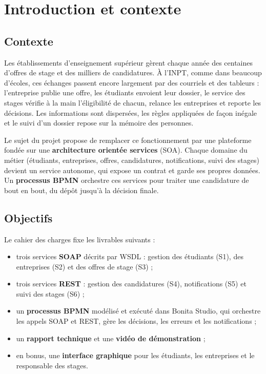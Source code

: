 \chapter{Introduction et contexte}\label{chap:introduction}

\section{Contexte}

Les établissements d'enseignement supérieur gèrent chaque année des centaines d'offres de stage et des milliers de candidatures. À l'INPT, comme dans beaucoup d'écoles, ces échanges passent encore largement par des courriels et des tableurs : l'entreprise publie une offre, les étudiants envoient leur dossier, le service des stages vérifie à la main l'éligibilité de chacun, relance les entreprises et reporte les décisions. Les informations sont dispersées, les règles appliquées de façon inégale et le suivi d'un dossier repose sur la mémoire des personnes.

Le sujet du projet propose de remplacer ce fonctionnement par une plateforme fondée sur une \textbf{architecture orientée services} (SOA). Chaque domaine du métier (étudiants, entreprises, offres, candidatures, notifications, suivi des stages) devient un service autonome, qui expose un contrat et garde ses propres données. Un \textbf{processus BPMN} orchestre ces services pour traiter une candidature de bout en bout, du dépôt jusqu'à la décision finale.

\section{Objectifs}

Le cahier des charges fixe les livrables suivants :
\begin{itemize}
  \item trois services \textbf{SOAP} décrits par WSDL : gestion des étudiants (S1), des entreprises (S2) et des offres de stage (S3) ;
  \item trois services \textbf{REST} : gestion des candidatures (S4), notifications (S5) et suivi des stages (S6) ;
  \item un \textbf{processus BPMN} modélisé et exécuté dans Bonita Studio, qui orchestre les appels SOAP et REST, gère les décisions, les erreurs et les notifications ;
  \item un \textbf{rapport technique} et une \textbf{vidéo de démonstration} ;
  \item en bonus, une \textbf{interface graphique} pour les étudiants, les entreprises et le responsable des stages.
\end{itemize}

